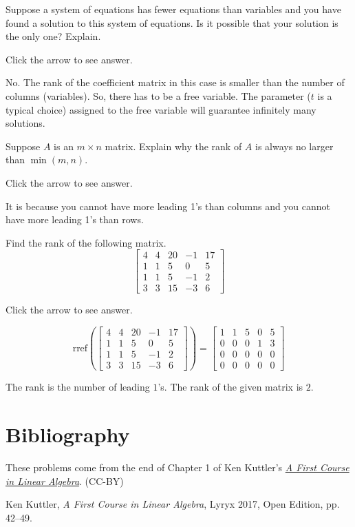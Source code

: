 \documentclass{ximera}
\begin{document}
\begin{problem}\label{prb:2.39} Suppose a system of equations has fewer equations than variables and
you have found a solution to this system of equations. Is it possible that
your solution is the only one? Explain.

Click the arrow to see answer. 
\begin{expandable}{}{}
No. The rank of the coefficient matrix in this case is smaller than the number of columns (variables).  So, there has to be a free variable.  The parameter ($t$ is a typical choice) assigned to the free variable will guarantee infinitely many solutions.
\end{expandable}
\end{problem}

\begin{problem}\label{prb:2.55} Suppose $A$ is an $m\times n$ matrix. Explain why the rank of $A$ is
always no larger than $\min \left( m,n\right).$

Click the arrow to see answer. 
\begin{expandable}{}{}
It is because you cannot
have more leading 1's than columns and you cannot have more leading 1's than rows.
\end{expandable}
\end{problem}

\begin{problem}\label{prb:2.53} Find the rank of the following matrix.
$$\begin{bmatrix}
4 & 4 & 20 & -1 & 17 \\
1 & 1 & 5 & 0 & 5 \\
1 & 1 & 5 & -1 & 2 \\
3 & 3 & 15 & -3 & 6
\end{bmatrix}$$

Click the arrow to see answer. 
\begin{expandable}{}{}
$$\text{rref}\left(\begin{bmatrix}4 & 4 & 20 & -1 & 17 \\
1 & 1 & 5 & 0 & 5 \\
1 & 1 & 5 & -1 & 2 \\
3 & 3 & 15 & -3 & 6\end{bmatrix}\right)=\begin{bmatrix}1 &1 &5 &0 &5\\
 0 & 0 &0 &1 &3\\
 0 &0 &0 &0 &0\\
 0& 0& 0& 0& 0\end{bmatrix}$$

 The rank is the number of leading $1$'s.  The rank of the given matrix is $2$.
\end{expandable}
\end{problem}

\section*{Bibliography}
These problems come from the end of Chapter 1 of Ken Kuttler's \href{https://open.umn.edu/opentextbooks/textbooks/a-first-course-in-linear-algebra-2017}{\it A First Course in Linear Algebra}. (CC-BY)

Ken Kuttler, {\it  A First Course in Linear Algebra}, Lyryx 2017, Open Edition, pp. 42--49. 
\end{document}
